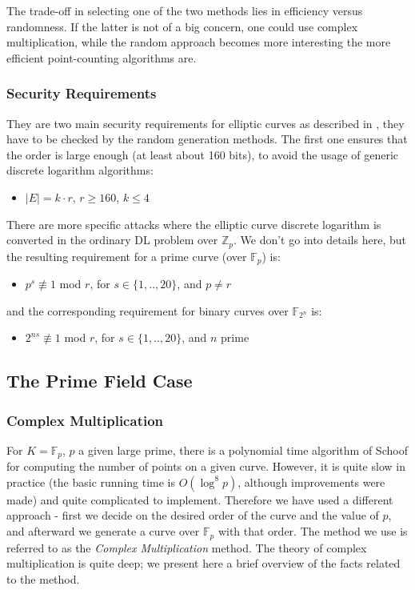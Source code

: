 \documentclass[11pt,english]{article}
\begin{document}
The trade-off in selecting one of the two methods lies in efficiency versus randomness. If the latter is not of a big concern, one could use complex multiplication, while the random approach becomes more interesting the more efficient point-counting algorithms are.

\subsubsection{Security Requirements}
They are two main security requirements for elliptic curves as described in \cite{buchmann}, they have to be checked by the random generation methods. The first one ensures that the order is large enough (at least about 160 bits), to avoid the usage of generic discrete logarithm algorithms:
\begin{itemize}
 \item $|E|=k\cdot r$, $r\geq 160$, $k\leq 4$
\end{itemize}
There are more specific attacks where the elliptic curve discrete logarithm is converted in the ordinary DL problem over $\mathbb{Z}_p$. We don't go into details here, but the resulting requirement for a prime curve (over $\mathbb{F}_p$) is:
\begin{itemize}
 \item $p^s\not\equiv 1$ mod $r$, for $s\in\{1,..,20\}$, and $p\neq r$
\end{itemize}
and the corresponding requirement for binary curves over $\mathbb{F}_{2^n}$ is:
\begin{itemize}
 \item $2^{ns}\not\equiv 1$ mod $r$, for $s\in\{1,..,20\}$, and $n$ prime
\end{itemize}


\subsection{The Prime Field Case}
\subsubsection{Complex Multiplication}
For $K=\mathbb{F}_p$, $p$ a given large prime, there is a polynomial time algorithm of Schoof for computing the number of points on a given curve.
However, it is quite slow in practice (the basic running time is $O(\log ^8p)$, although improvements were made) and quite complicated to implement.
Therefore we have used a different approach - first we decide on the desired order of the curve and the value of $p$, and afterward we generate a
curve over $\mathbb{F}_p$ with that order. The method we use is referred to as the \emph{Complex Multiplication} method. The theory of complex
multiplication is quite deep; we present here a brief overview of the facts related to the method.
\end{document}
